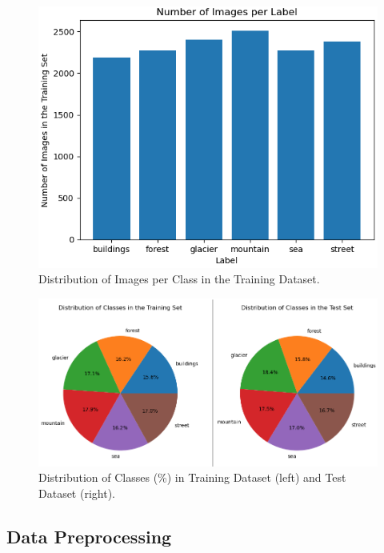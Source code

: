 \documentclass[conference]{IEEEtran}
\begin{document}
\begin{figure}[H]
    \centering
    \includegraphics[width=0.8\linewidth]{images/nImagesTrain.png}
    \caption{Distribution of Images per Class in the Training Dataset.}
    \label{fig:numImagesTrain}
\end{figure}

\begin{figure}[H]
    \centering
    \includegraphics[width=1\linewidth]{images/percentTrainAndTest.png}
    \caption{Distribution of Classes (\%) in Training Dataset (left) and Test Dataset (right).}
    \label{fig:percentTrainAndTest}
\end{figure}


\subsection{Data Preprocessing} 

\end{document}
